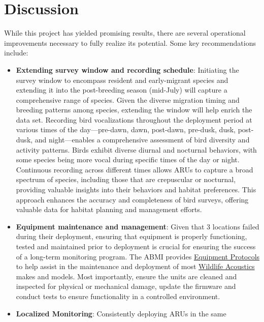 \documentclass[
  letterpaper,
  DIV=11,
  numbers=noendperiod,
  oneside]{scrartcl}
\begin{document}
\hypertarget{discussion}{%
\section{Discussion}\label{discussion}}

While this project has yielded promising results, there are several
operational improvements necessary to fully realize its potential. Some
key recommendations include:

\begin{itemize}
\item
  \textbf{Extending survey window and recording schedule}: Initiating
  the survey window to encompass resident and early-migrant species and
  extending it into the post-breeding season (mid-July) will capture a
  comprehensive range of species. Given the diverse migration timing and
  breeding patterns among species, extending the window will help enrich
  the data set. Recording bird vocalizations throughout the deployment
  period at various times of the day---pre-dawn, dawn, post-dawn,
  pre-dusk, dusk, post-dusk, and night---enables a comprehensive
  assessment of bird diversity and activity patterns. Birds exhibit
  diverse diurnal and nocturnal behaviors, with some species being more
  vocal during specific times of the day or night. Continuous recording
  across different times allows ARUs to capture a broad spectrum of
  species, including those that are crepuscular or nocturnal, providing
  valuable insights into their behaviors and habitat preferences. This
  approach enhances the accuracy and completeness of bird surveys,
  offering valuable data for habitat planning and management efforts.
\item
  \textbf{Equipment maintenance and management}: Given that 3 locations
  failed during their deployment, ensuring that equipment is properly
  functioning, tested and maintained prior to deployment is crucial for
  ensuring the success of a long-term monitoring program. The ABMI
  provides
  \href{https://ftp-public.abmi.ca/home/publications/documents/599_ABMI_2021_TerrestrialARUandRemoteCameraTrapProtocols_ABMI.pdf}{Equipment
  Protocols} to help assist in the maintenance and deployment of most
  \href{https://www.wildlifeacoustics.com/}{Wildlife Acoustics} makes
  and models. Most importantly, ensure the units are cleaned and
  inspected for physical or mechanical damage, update the firmware and
  conduct tests to ensure functionality in a controlled environment.
\item
  \textbf{Localized Monitoring}: Consistently deploying ARUs in the same

\end{itemize}
\end{document}
